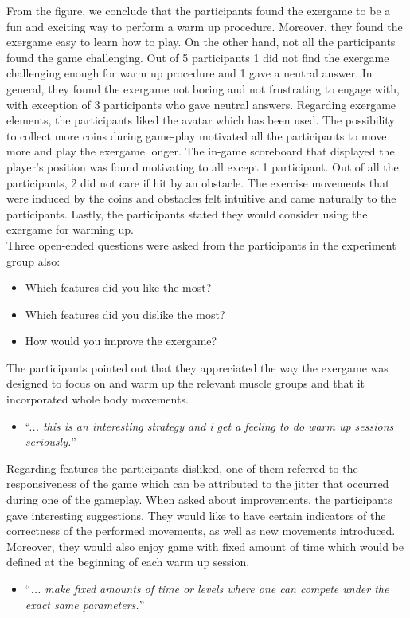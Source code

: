 From the figure, we conclude that the participants found the exergame to be a fun and exciting way to perform a warm up procedure. Moreover, they found the exergame easy to learn how to play. On the other hand, not all the participants found the game challenging. Out of 5 participants 1 did not find the exergame challenging enough for warm up procedure and 1 gave a neutral answer. In general, they found the exergame not boring and not frustrating to engage with, with exception of 3 participants who gave neutral answers.  Regarding exergame elements, the participants liked the avatar which has been used. The possibility to collect more coins during game-play motivated all the participants to move more and play the exergame longer. The in-game scoreboard that displayed the player's position was found motivating to all except 1 participant. Out of all the participants, 2 did not care if hit by an obstacle. The exercise movements that were induced by the coins and obstacles felt intuitive and came naturally to the participants.  Lastly, the participants stated they would consider using the exergame for warming up. \\Three open-ended questions were asked from the participants in the experiment group also:
\begin{itemize}
 \item Which features did you like the most?
 \item Which features did you dislike the most?
 \item How would you improve the exergame?
\end{itemize}
The participants pointed out that they appreciated the way the exergame was designed to focus on and warm up the relevant muscle groups and that it incorporated whole body movements.
\begin{itemize}
\item ``.\textit{.. this is an interesting strategy and i get a feeling to do warm up sessions seriously.}''
\end{itemize}
Regarding features the participants disliked, one of them referred to the responsiveness of the game which can be attributed to the jitter that occurred during one of the gameplay. When asked about improvements, the participants  gave interesting suggestions. They would like to have certain indicators of the correctness of the performed movements, as well as new movements introduced. Moreover, they would also enjoy  game with fixed amount of time which would be defined at the beginning of each warm up session. 
\begin{itemize}
\item ``\textit{... make fixed amounts of time or levels where one can compete under the exact same parameters.}''
\end{itemize}

